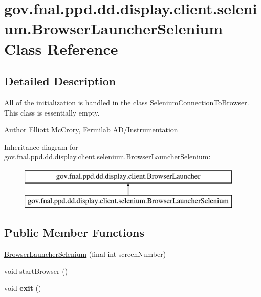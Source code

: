 \hypertarget{classgov_1_1fnal_1_1ppd_1_1dd_1_1display_1_1client_1_1selenium_1_1BrowserLauncherSelenium}{\section{gov.\-fnal.\-ppd.\-dd.\-display.\-client.\-selenium.\-Browser\-Launcher\-Selenium Class Reference}
\label{classgov_1_1fnal_1_1ppd_1_1dd_1_1display_1_1client_1_1selenium_1_1BrowserLauncherSelenium}
}


\subsection{Detailed Description}
All of the initialization is handled in the class \hyperlink{classgov_1_1fnal_1_1ppd_1_1dd_1_1display_1_1client_1_1selenium_1_1SeleniumConnectionToBrowser}{Selenium\-Connection\-To\-Browser}. This class is essentially empty.

\begin{DoxyAuthor}{Author}
Elliott Mc\-Crory, Fermilab A\-D/\-Instrumentation 
\end{DoxyAuthor}
Inheritance diagram for gov.\-fnal.\-ppd.\-dd.\-display.\-client.\-selenium.\-Browser\-Launcher\-Selenium\-:\begin{figure}[H]
\begin{center}
\leavevmode
\includegraphics[height=2.000000cm]{classgov_1_1fnal_1_1ppd_1_1dd_1_1display_1_1client_1_1selenium_1_1BrowserLauncherSelenium}
\end{center}
\end{figure}
\subsection*{Public Member Functions}
\begin{DoxyCompactItemize}
\item 
\hyperlink{classgov_1_1fnal_1_1ppd_1_1dd_1_1display_1_1client_1_1selenium_1_1BrowserLauncherSelenium_a6dba4c570a0e2fa5d76634651bfcdc4c}{Browser\-Launcher\-Selenium} (final int screen\-Number)
\item 
void \hyperlink{classgov_1_1fnal_1_1ppd_1_1dd_1_1display_1_1client_1_1selenium_1_1BrowserLauncherSelenium_ae5cf136a72446c0de67d0681f6f3f773}{start\-Browser} ()
\item 
\hypertarget{classgov_1_1fnal_1_1ppd_1_1dd_1_1display_1_1client_1_1selenium_1_1BrowserLauncherSelenium_a6cff25c796ef423461240029f69a57ad}{void {\bfseries exit} ()}\label{classgov_1_1fnal_1_1ppd_1_1dd_1_1display_1_1client_1_1selenium_1_1BrowserLauncherSelenium_a6cff25c796ef423461240029f69a57ad}

\end{DoxyCompactItemize}
